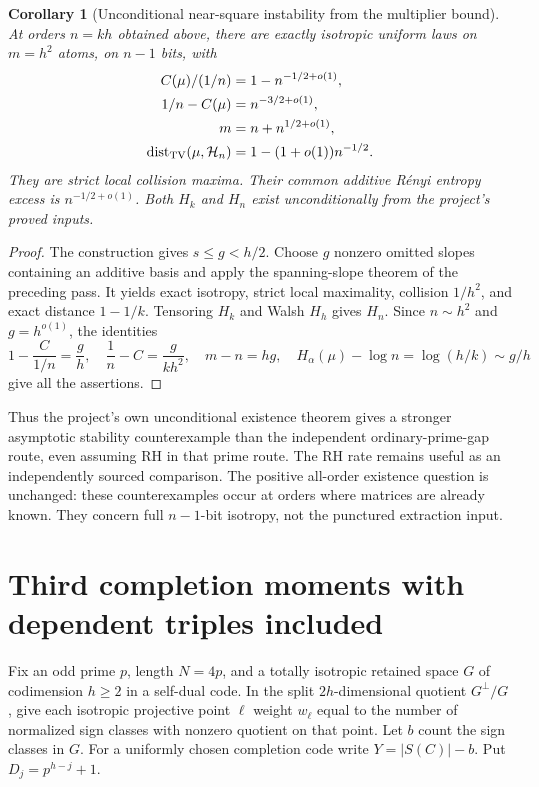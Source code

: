 \documentclass[11pt]{article}
\newtheorem{corollary}[theorem]{Corollary}
\begin{document}
\begin{corollary}[Unconditional near-square instability from the multiplier bound]
\label{cor:stability-project-rate}
At orders $n=kh$ obtained above, there are exactly isotropic uniform
laws on $m=h^2$ atoms, on $n-1$ bits, with
\[
 \begin{split}
 C(\mu)/(1/n)&=1-n^{-1/2+o(1)},\\
 1/n-C(\mu)&=n^{-3/2+o(1)},\\
 m&=n+n^{1/2+o(1)},\\
 \operatorname{dist}_{\rm TV}(\mu,\mathcal H_n)
       &=1-(1+o(1))n^{-1/2}.
 \end{split}
\]
They are strict local collision maxima. Their common additive
R\'enyi entropy excess is $n^{-1/2+o(1)}$.
Both $H_k$ and $H_n$ exist unconditionally from the project's
proved inputs.
\end{corollary}
\begin{proof}
The construction gives $s\le g<h/2$. Choose $g$ nonzero omitted
slopes containing an additive basis and apply the spanning-slope
theorem of the preceding pass. It yields exact isotropy, strict
local maximality, collision $1/h^2$, and exact distance $1-1/k$.
Tensoring $H_k$ and Walsh $H_h$ gives $H_n$.
Since $n\sim h^2$ and $g=h^{o(1)}$, the identities
\[
 1-\frac{C}{1/n}=\frac gh,\quad
 \frac1n-C=\frac{g}{kh^2},\quad
 m-n=hg,\quad
 H_\alpha(\mu)-\log n=\log(h/k)\sim g/h
\]
give all the assertions.
\end{proof}

Thus the project's own unconditional existence theorem gives a
stronger asymptotic stability counterexample than the independent
ordinary-prime-gap route, even assuming RH in that prime route.
The RH rate remains useful as an independently sourced comparison.
The positive all-order existence question is unchanged: these
counterexamples occur at orders where matrices are already known.
They concern full $n-1$-bit isotropy, not the punctured extraction input.
\section{Third completion moments with dependent triples included}
Fix an odd prime $p$, length $N=4p$, and a totally isotropic retained
space $G$ of codimension $h\ge2$ in a self-dual code. In the split
$2h$-dimensional quotient $G^\perp/G$, give each isotropic projective
point $\ell$ weight $w_\ell$ equal to the number of normalized sign
classes with nonzero quotient on that point. Let $b$ count the sign
classes in $G$. For a uniformly chosen completion code write
$Y=|S(C)|-b$. Put $D_j=p^{h-j}+1$.
\end{document}
